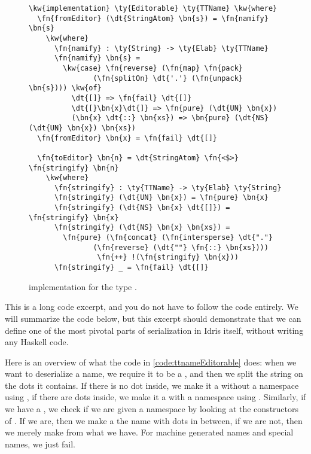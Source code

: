 \begin{figure}[ht]
\caption{ implementation for the type .}
\label{code:ttnameEditorable}
\begin{Verbatim}[framesep=2mm, label=\footnotesize{\normalfont{Idris}}, labelposition=topline]
\kw{implementation} \ty{Editorable} \ty{TTName} \kw{where}
  \fn{fromEditor} (\dt{StringAtom} \bn{s}) = \fn{namify} \bn{s}
    \kw{where}
      \fn{namify} : \ty{String} -> \ty{Elab} \ty{TTName}
      \fn{namify} \bn{s} =
        \kw{case} \fn{reverse} (\fn{map} \fn{pack}
               (\fn{splitOn} \dt{'.'} (\fn{unpack} \bn{s}))) \kw{of}
          \dt{[]} => \fn{fail} \dt{[]}
          \dt{[}\bn{x}\dt{]} => \fn{pure} (\dt{UN} \bn{x})
          (\bn{x} \dt{::} \bn{xs}) => \bn{pure} (\dt{NS} (\dt{UN} \bn{x}) \bn{xs})
  \fn{fromEditor} \bn{x} = \fn{fail} \dt{[]}

  \fn{toEditor} \bn{n} = \dt{StringAtom} \fn{<$>} \fn{stringify} \bn{n}
    \kw{where}
      \fn{stringify} : \ty{TTName} -> \ty{Elab} \ty{String}
      \fn{stringify} (\dt{UN} \bn{x}) = \fn{pure} \bn{x}
      \fn{stringify} (\dt{NS} \bn{x} \dt{[]}) = \fn{stringify} \bn{x}
      \fn{stringify} (\dt{NS} \bn{x} \bn{xs}) =
        \fn{pure} (\fn{concat} (\fn{intersperse} \dt{"."}
               (\fn{reverse} (\dt{""} \fn{::} \bn{xs})))
                \fn{++} !(\fn{stringify} \bn{x}))
      \fn{stringify} _ = \fn{fail} \dt{[]}
\end{Verbatim}
\end{figure}

This is a long code excerpt, and you do not have to follow the code entirely.
We will summarize the code below, but this excerpt should demonstrate that
we can define one of the most pivotal parts of serialization in Idris itself,
without writing any Haskell code.

Here is an overview of what the code in \autoref{code:ttnameEditorable} does:
when we want to deserialize a name, we require it to be a , and
then we split the string  on the dots it contains. If there is no dot
inside, we make it a  without a namespace using , if there
are dots inside, we make it a  with a namespace using .
Similarly, if we have a , we check if we are given a namespace by
looking at the constructors of . If we are, then we make a
 the name with dots in between, if we are not, then we merely make
 from what we have.
For machine generated names and special names, we just fail.

